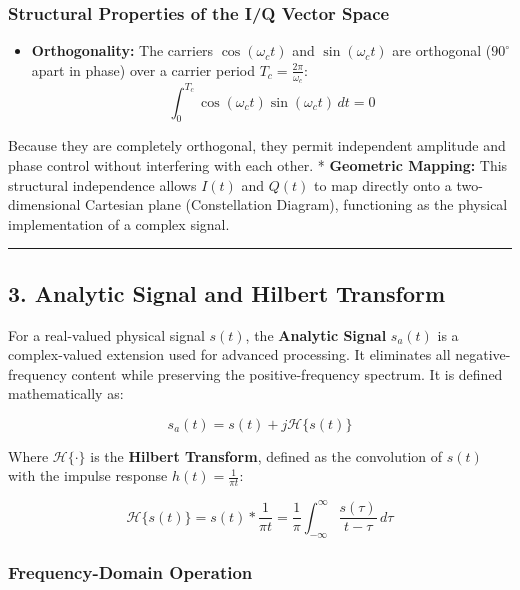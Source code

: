 \documentclass[
]{article}
\providecommand{\tightlist}{%
  \setlength{\itemsep}{0pt}\setlength{\parskip}{0pt}}
\begin{document}
\subsubsection{Structural Properties of the I/Q Vector
Space}\label{structural-properties-of-the-iq-vector-space}

\begin{itemize}
\tightlist
\item
  \textbf{Orthogonality:} The carriers \(\cos(\omega_c t)\) and
  \(\sin(\omega_c t)\) are orthogonal (\(90^\circ\) apart in phase) over
  a carrier period \(T_c = \frac{2\pi}{\omega_c}\):
  \[\int_{0}^{T_c} \cos(\omega_c t)\sin(\omega_c t) \, dt = 0\]
\end{itemize}

Because they are completely orthogonal, they permit independent
amplitude and phase control without interfering with each other. *
\textbf{Geometric Mapping:} This structural independence allows \(I(t)\)
and \(Q(t)\) to map directly onto a two-dimensional Cartesian plane
(Constellation Diagram), functioning as the physical implementation of a
complex signal.

\begin{center}\rule{0.5\linewidth}{0.5pt}\end{center}

\subsection{3. Analytic Signal and Hilbert
Transform}\label{analytic-signal-and-hilbert-transform}

For a real-valued physical signal \(s(t)\), the \textbf{Analytic Signal}
\(s_a(t)\) is a complex-valued extension used for advanced processing.
It eliminates all negative-frequency content while preserving the
positive-frequency spectrum. It is defined mathematically as:

\[s_a(t) = s(t) + j \mathcal{H}\{s(t)\}\]

Where \(\mathcal{H}\{\cdot\}\) is the \textbf{Hilbert Transform},
defined as the convolution of \(s(t)\) with the impulse response
\(h(t) = \frac{1}{\pi t}\):

\[\mathcal{H}\{s(t)\} = s(t) * \frac{1}{\pi t} = \frac{1}{\pi} \int_{-\infty}^{\infty} \frac{s(\tau)}{t - \tau} \, d\tau\]

\subsubsection{Frequency-Domain
Operation}\label{frequency-domain-operation}
\end{document}
